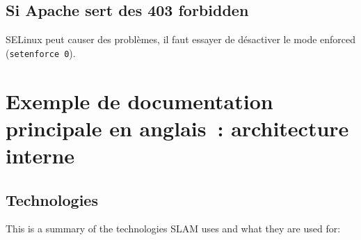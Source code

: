 \documentclass[12pt,a4paper,twoside]{report}
\begin{document}
\subsection*{Si Apache sert des 403 forbidden}

SELinux peut causer des problèmes, il faut essayer de désactiver le mode enforced (\verb+setenforce 0+).


\section*{Exemple de documentation principale en anglais~: architecture interne}
\label{internal:internals}\label{internal::doc}

\subsection*{Technologies}
\label{internal_general:technologies}\label{internal_general::doc}
This is a summary of the technologies SLAM uses and what they are used for:
\end{document}
